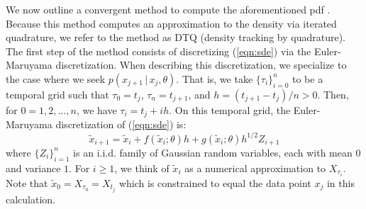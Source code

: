 \documentclass[wcp]{jmlr}
\begin{document}
We now outline a convergent method to compute the aforementioned
pdf \citep{BhatMadu2016}.  Because this method computes an approximation to the density via
iterated quadrature, we refer to the method as DTQ (density tracking
by quadrature).  The first step of the method consists of discretizing
(\ref{eqn:sde}) via the Euler-Maruyama discretization.  When
describing this discretization, we specialize to the case where we
seek $p(x_{j+1} \, | \, x_j, \theta)$.  That is, we take
$\{\tau_i\}_{i=0}^n$ to be a temporal grid such that $\tau_0 = t_j$,
$\tau_n = t_{j+1}$, and $h = (t_{j+1} - t_j)/n > 0$.  Then, for $0 =
1, 2, \ldots, n$, we have $\tau_i = t_j + i h$.  On this temporal
grid, the Euler-Maruyama discretization of (\ref{eqn:sde}) is:
\begin{equation}
\label{eqn:sde_em}
\tilde{x}_{i+1} = \tilde{x}_i + f(\tilde{x}_i; \theta) h +
g(\tilde{x}_i; \theta) h^{1/2} Z_{i+1}
\end{equation}
where $\{Z_i\}_{i=1}^{n}$ is an i.i.d. family of Gaussian random
variables, each with mean $0$ and variance $1$.  For $i \geq 1$, we
think of $\tilde{x}_i$ as a numerical approximation to $X_{\tau_i}$.
Note that $\tilde{x}_0 = X_{\tau_0} = X_{t_j}$ which is constrained to
equal the data point $x_j$ in this calculation.
\end{document}
